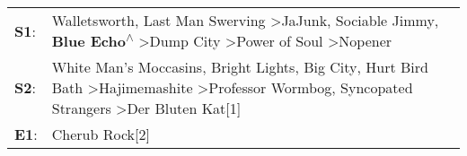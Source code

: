 \begin{supertabular}{p{0.03\textwidth}p{0.92\textwidth}}
 \textbf{S1}:  &  Walletsworth\textsuperscript{}, \enspace Last Man Swerving\textsuperscript{} \textgreater \enspace JaJunk\textsuperscript{}, \enspace Sociable Jimmy\textsuperscript{}, \enspace \textbf{Blue Echo\textsuperscript{$\wedge$}} \textgreater \enspace Dump City\textsuperscript{} \textgreater \enspace Power of Soul\textsuperscript{} \textgreater \enspace Nopener\textsuperscript{}  \enspace  \\
 \textbf{S2}:  &                      White Man's Moccasins\textsuperscript{}, \enspace Bright Lights, Big City\textsuperscript{}, \enspace Hurt Bird Bath\textsuperscript{} \textgreater \enspace Hajimemashite\textsuperscript{} \textgreater \enspace Professor Wormbog\textsuperscript{}, \enspace Syncopated Strangers\textsuperscript{} \textgreater \enspace Der Bluten Kat[1]\textsuperscript{}  \enspace  \\
 \textbf{E1}:  &                                                                                                                                                                                                                                                                                                                                                       Cherub Rock[2]\textsuperscript{}  \enspace  \\
\end{supertabular}
